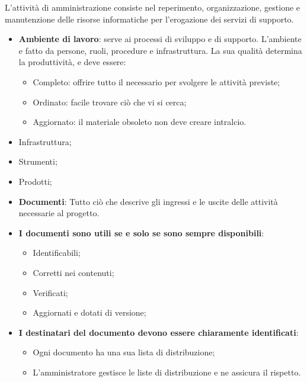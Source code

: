 \documentclass[a4paper,10pt] {article}
\begin{document}
\begin{itemize}
	L'attività di amministrazione consiste nel reperimento, organizzazione, 
	gestione e manutenzione delle risorse informatiche per l'erogazione dei 
	servizi di supporto.
		\begin{itemize}
			\item \textbf{Ambiente di lavoro}: serve ai processi di sviluppo e 
			di supporto. L'ambiente e fatto da persone, ruoli, procedure e 
			infrastruttura. La sua qualità determina la produttività, e deve 
			essere: 
					\begin{itemize}
						\item Completo: offrire tutto il necessario per 
						svolgere le attività previste;
						\item Ordinato: facile trovare ciò che vi si cerca;
						\item Aggiornato: il materiale obsoleto non deve creare 
						intralcio. 
					\end{itemize}			
			\item Infrastruttura;
			\item Strumenti;
			\item Prodotti;
			\item \textbf{Documenti}: Tutto ciò che descrive gli ingressi e le 
			uscite delle attività necessarie al progetto.
			\item \textbf{I documenti sono utili se e solo se sono sempre 
			disponibili}:
				\begin{itemize}
					\item Identificabili;
					\item Corretti nei contenuti;
					\item Verificati;
					\item Aggiornati e dotati di versione;
				\end{itemize}
			\item \textbf{I destinatari del documento devono essere chiaramente 
			identificati}:
				\begin{itemize}
					\item Ogni documento ha una sua lista di distribuzione;
					\item L'amministratore gestisce le liste di distribuzione e 
					ne assicura il rispetto.
				\end{itemize}
		\end{itemize}
	
	
	
	



\end{itemize}
\end{document}
